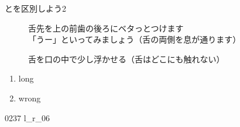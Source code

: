 \documentclass[aspectratio=169, xcolor={dvipsnames,table}]{beamer}
\begin{document}
\begin{frame}[plain]{とを区別しよう2}
  \begin{description}
    \item[] 舌先を上の前歯の後ろにベタっとつけます\\
          「うー」といってみましょう（舌の両側を息が通ります）

    \item[] 舌を口の中で少し浮かせる（舌はどこにも触れない）\\
  \end{description}

  \Large

  \begin{enumerate}
    \item long\hfill{}\hspace{250pt}\mbox{}

    \item wrong\hfill{}\hspace{250pt}\mbox{}
  \end{enumerate}
  \hfill\hfill{\tiny 0237}\,{\scriptsize {}}\,{\tiny l\_r\_06}
\end{frame}
\end{document}
